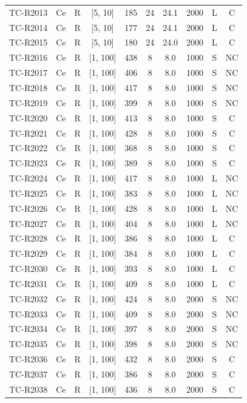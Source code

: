 \begin{longtable}{lccccccccc}
TC-R2013 & Ce & R & [5, 10] & 185 & 24 & 24.1 & 2000 & L & C \\
TC-R2014 & Ce & R & [5, 10] & 177 & 24 & 24.1 & 2000 & L & C \\
TC-R2015 & Ce & R & [5, 10] & 180 & 24 & 24.0 & 2000 & L & C \\
TC-R2016 & Ce & R & [1, 100] & 438 & 8 & 8.0 & 1000 & S & NC \\
TC-R2017 & Ce & R & [1, 100] & 406 & 8 & 8.0 & 1000 & S & NC \\
TC-R2018 & Ce & R & [1, 100] & 417 & 8 & 8.0 & 1000 & S & NC \\
TC-R2019 & Ce & R & [1, 100] & 399 & 8 & 8.0 & 1000 & S & NC \\
TC-R2020 & Ce & R & [1, 100] & 413 & 8 & 8.0 & 1000 & S & C \\
TC-R2021 & Ce & R & [1, 100] & 428 & 8 & 8.0 & 1000 & S & C \\
TC-R2022 & Ce & R & [1, 100] & 368 & 8 & 8.0 & 1000 & S & C \\
TC-R2023 & Ce & R & [1, 100] & 389 & 8 & 8.0 & 1000 & S & C \\
TC-R2024 & Ce & R & [1, 100] & 417 & 8 & 8.0 & 1000 & L & NC \\
TC-R2025 & Ce & R & [1, 100] & 383 & 8 & 8.0 & 1000 & L & NC \\
TC-R2026 & Ce & R & [1, 100] & 428 & 8 & 8.0 & 1000 & L & NC \\
TC-R2027 & Ce & R & [1, 100] & 404 & 8 & 8.0 & 1000 & L & NC \\
TC-R2028 & Ce & R & [1, 100] & 386 & 8 & 8.0 & 1000 & L & C \\
TC-R2029 & Ce & R & [1, 100] & 384 & 8 & 8.0 & 1000 & L & C \\
TC-R2030 & Ce & R & [1, 100] & 393 & 8 & 8.0 & 1000 & L & C \\
TC-R2031 & Ce & R & [1, 100] & 409 & 8 & 8.0 & 1000 & L & C \\
TC-R2032 & Ce & R & [1, 100] & 424 & 8 & 8.0 & 2000 & S & NC \\
TC-R2033 & Ce & R & [1, 100] & 409 & 8 & 8.0 & 2000 & S & NC \\
TC-R2034 & Ce & R & [1, 100] & 397 & 8 & 8.0 & 2000 & S & NC \\
TC-R2035 & Ce & R & [1, 100] & 398 & 8 & 8.0 & 2000 & S & NC \\
TC-R2036 & Ce & R & [1, 100] & 432 & 8 & 8.0 & 2000 & S & C \\
TC-R2037 & Ce & R & [1, 100] & 386 & 8 & 8.0 & 2000 & S & C \\
TC-R2038 & Ce & R & [1, 100] & 436 & 8 & 8.0 & 2000 & S & C \\

\end{longtable}
